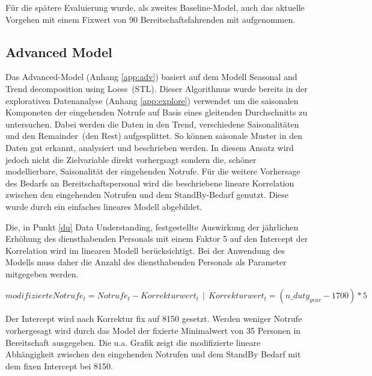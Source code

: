 \FloatBarrier

Für die spätere Evaluierung wurde, als zweites Baseline-Model, auch das aktuelle Vorgehen mit einem Fixwert von 90 Bereitschaftsfahrenden mit aufgenommen.

 \subsection{Advanced Model} 

Das Advanced-Model (Anhang \ref{app:adv}) basiert auf dem Modell \glqq Seasonal and Trend decomposition using Loess\grqq\ (STL). Dieser Algorithmus wurde bereits in der explorativen Datenanalyse (Anhang \ref{app:explore}) verwendet um die saisonalen Komponeten der eingehenden Notrufe auf Basis eines gleitenden Durchschnitts zu untersuchen. Dabei werden die Daten in den Trend, verschiedene Saisonalitäten und den \glqq Remainder\grqq\ (den Rest) aufgesplittet. So können saisonale Muster in den Daten gut erkannt, analysiert und beschrieben werden. In diesem Ansatz wird jedoch nicht die Zielvariable direkt vorhergsagt sondern die, schöner modellierbare, Saisonalität der eingehenden Notrufe. Für die weitere Vorhersage des Bedarfs an Bereitschaftspersonal wird die beschriebene lineare Korrelation zwischen den eingehenden Notrufen und dem StandBy-Bedarf genutzt. Diese wurde durch ein einfaches lineares Modell abgebildet.

Die, in Punkt \ref{du} Data Understanding,  festgestellte Auswirkung der jährlichen Erhöhung des diensthabenden Personals mit einem Faktor 5 auf den Intercept der Korrelation wird im linearen Modell berücksichtigt. Bei der Anwendung des Modells muss daher die Anzahl des diensthabenden Personals als Parameter mitgegeben werden.

\[modifizierte Notrufe_t = Notrufe_t - Korrekturwert_t\ \ |\ \   Korrekturwert_t = (n\_duty_{year} - 1700) * 5\]

Der Intercept wird nach Korrektur fix auf 8150 gesetzt. Werden weniger Notrufe vorhergesagt wird durch das Model der fixierte Minimalwert von 35 Personen in Bereitschaft ausgegeben.  Die u.a. Grafik zeigt die modifizierte lineare Abhängigkeit zwischen den eingehenden Notrufen und dem StandBy Bedarf mit dem fixen Intercept bei 8150.


